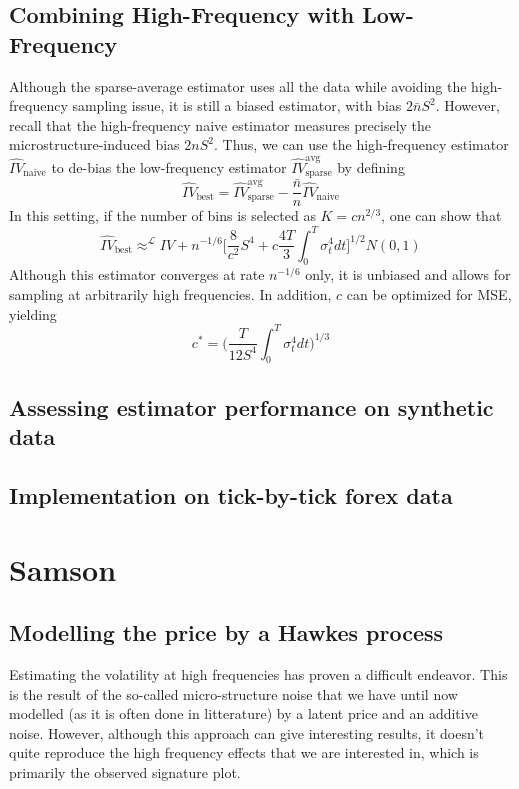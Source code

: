 \documentclass[a4paper,12pt,twoside]{article}
\begin{document}
\subsection{Combining High-Frequency with Low-Frequency}
Although the sparse-average estimator uses all the data while avoiding the high-frequency sampling issue, it is still a biased estimator, with bias $2\bar{n}S^2$. However, recall that the high-frequency naive estimator measures precisely the microstructure-induced bias $2nS^2$. Thus, we can use the high-frequency estimator $\hat{IV}_\text{naive}$ to de-bias the low-frequency estimator $\hat{IV}_\text{sparse}^\text{avg}$ by defining $$\hat{IV}_\text{best}=\hat{IV}_\text{sparse}^\text{avg}-\frac{\bar{n}}{n}\hat{IV}_\text{naive}$$
In this setting, if the number of bins is selected as $K=cn^{2/3}$, one can show that
$$\hat{IV}_\text{best} \approx^{\mathcal{L}} IV + n^{-1/6}\big[ \frac{8}{c^2}S^4 + c\frac{4T}{3}\int_0^T \sigma_t^4 dt \big]^{1/2}N(0,1)$$
Although this estimator converges at rate $n^{-1/6}$ only, it is unbiased and allows for sampling at arbitrarily high frequencies. In addition, $c$ can be optimized for MSE, yielding $$c^*=\big( \frac{T}{12S^4}\int_0^T \sigma_t^4 dt \big)^{1/3}$$

\subsection{Assessing estimator performance on synthetic data}

\subsection{Implementation on tick-by-tick forex data}


\section{Samson} \label{section-samson}
\subsection{Modelling the price by a Hawkes process}

Estimating the volatility at high frequencies has proven a difficult endeavor. This is the result of the so-called micro-structure noise that we have until now modelled (as it is often done in litterature) by a latent price and an additive noise. 
However, although this approach can give interesting results, it doesn't quite reproduce the high frequency effects that we are interested in, which is primarily the observed signature plot. 
\end{document}
